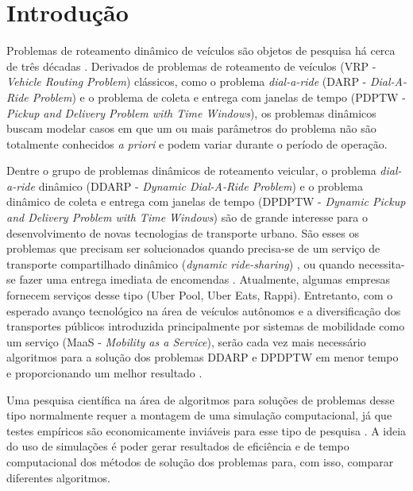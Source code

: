 \chapter{Introdução}\label{ch:introducao}

Problemas de roteamento dinâmico de veículos são objetos de pesquisa há cerca 
de três décadas \cite{psaraftis_dynamic_2015}.
Derivados de problemas de roteamento de veículos (VRP - \textit{Vehicle Routing 
Problem}) clássicos, como o problema \textit{dial-a-ride} (DARP -
\textit{Dial-A-Ride Problem}) e o problema de coleta e entrega com
janelas de tempo (PDPTW - \textit{Pickup and Delivery Problem with 
Time Windows}), os problemas dinâmicos buscam modelar casos em que um 
ou mais parâmetros do problema não são totalmente conhecidos 
\textit{a priori} e podem variar durante o período de operação. 

Dentre o grupo de problemas dinâmicos de roteamento veicular, o problema 
\textit{dial-a-ride} dinâmico (DDARP - \textit{Dynamic Dial-A-Ride Problem}) 
\cite{psaraftis_dynamic_1988} e o problema dinâmico de coleta e entrega com
janelas de tempo (DPDPTW - \textit{Dynamic Pickup and Delivery Problem with 
Time Windows}) \cite{dumas_1991} são de grande interesse para o 
desenvolvimento de novas tecnologias de transporte urbano. 
São esses os problemas que precisam ser solucionados quando precisa-se 
de um serviço de transporte compartilhado dinâmico (\textit{dynamic 
ride-sharing}) \cite{agatz_optimization_2012, 
alonso-gonzalez_potential_2018}, ou quando necessita-se 
fazer uma entrega imediata de encomendas \cite{pankratz_dynamic_2005}.
Atualmente, algumas empresas fornecem serviços desse tipo (Uber Pool, Uber
Eats, Rappi).
Entretanto, com o esperado avanço tecnológico na área de veículos
autônomos e a diversificação dos transportes públicos introduzida
principalmente por sistemas de mobilidade como um serviço (MaaS -
\textit{Mobility as a Service}), serão cada vez mais necessário algoritmos 
para a solução dos problemas DDARP e DPDPTW em menor tempo e proporcionando 
um melhor resultado \cite{fulton_three_2017}. 

Uma pesquisa científica na área de algoritmos para soluções de problemas 
desse tipo normalmente requer a montagem de uma simulação computacional,
já que testes empíricos são economicamente inviáveis para
esse tipo de pesquisa \cite{maciejewski_towards_2017}.
A ideia do uso de simulações é poder gerar resultados de eficiência e de 
tempo computacional dos métodos de solução dos problemas para, com isso, 
comparar diferentes algoritmos.

